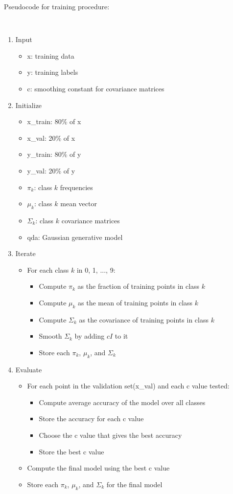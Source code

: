 \documentclass{article}
\begin{document}
\parbox{\textwidth}{Pseudocode for training procedure:}\\
\begin{enumerate}
\item Input
\begin{itemize}
    \item x: training data
    \item y: training labels
    \item c: smoothing constant for covariance matrices
\end{itemize}
\item Initialize
\begin{itemize}
    \item x\_train: 80\% of x
    \item x\_val: 20\% of x
    \item y\_train: 80\% of y
    \item y\_val: 20\% of y
    \item $\pi_k$: class $k$ frequencies
    \item $\mu_k$: class $k$ mean vector
    \item $\Sigma_k$: class $k$ covariance matrices
    \item qda: Gaussian generative model
\end{itemize}
\item Iterate
\begin{itemize}
    \item For each class $k$ in {0, 1, ..., 9}:
    \begin{itemize}
        \item Compute $\pi_k$ as the fraction of training points in class $k$
        \item Compute $\mu_k$ as the mean of training points in class $k$
        \item Compute $\Sigma_k$ as the covariance of training points in class $k$
        \item Smooth $\Sigma_k$ by adding $cI$ to it
        \item Store each $\pi_k$, $\mu_k$, and $\Sigma_k$
    \end{itemize}
\end{itemize}
\item Evaluate
\begin{itemize}
    \item For each point in the validation set(x\_val) and each c value tested:
    \begin{itemize}
        \item Compute average accuracy of the model over all classes
        \item Store the accuracy for each c value
        \item Choose the c value that gives the best accuracy
        \item Store the best c value
    \end{itemize}
    \item Compute the final model using the best c value
    \item Store each $\pi_k$, $\mu_k$, and $\Sigma_k$ for the final model
\end{itemize}
\end{enumerate}
\end{document}
